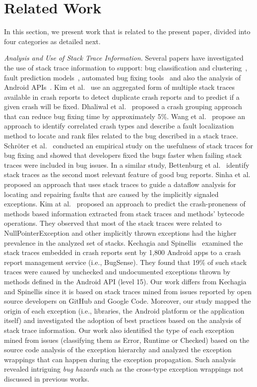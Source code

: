 \section{Related Work}
\label{sec:rele}

In this section, we present work that is related to the present paper, divided into
four categories as detailed next.

\textit{Analysis and Use of Stack Trace Information.} Several papers have
investigated the use of stack trace information to support: bug classification
and clustering~\cite{wang2013improving, kim2011crash, dhaliwal2011classifying},
fault prediction models~\cite{kim2013predicting}, automated
bug fixing tools~\cite{sinha2009fault} and also the analysis of Android APIs~\cite{kechagia2014}. 
Kim et al.~\cite{kim2011crash} use an
aggregated form of multiple stack traces available in crash reports to detect
duplicate crash reports and to predict if a given crash will be fixed. Dhaliwal
et al.~\cite{dhaliwal2011classifying} proposed a crash grouping approach that
can reduce bug fixing time by approximately 5\%. Wang et
al.~\cite{wang2013improving} propose an approach to identify correlated crash
types and describe a fault localization method to locate and rank files related
to the bug described in a stack trace. Schr\"oter et al.~\cite{schroter2010stack}
conducted an empirical study on the usefulness of stack traces for bug fixing
and showed that developers fixed the bugs faster when failing stack traces were
included in bug issues.  In a similar study, Bettenburg et
al.~\cite{bettenburg2008makes} identify stack traces as the second most relevant
 feature of good bug reports.  Sinha et al.~\cite{sinha2009fault} proposed an
approach that uses stack traces to guide a dataflow analysis for locating and
repairing faults that are caused by the implicitly signaled exceptions. Kim
at al.~\cite{kim2013predicting} proposed an approach to predict the
crash-proneness of methods based information extracted from stack traces and
methods' bytecode operations.  They observed that most of the stack traces were
related to NullPointerException and other implicitly thrown exceptions had
the higher prevalence in the analyzed set of stacks. Kechagia and Spinellis~\cite{kechagia2014}
examined the stack traces embedded in crash reports sent by 1,800 Android apps 
to a crash report management service (i.e., BugSense). They found that 19\% of such stack traces
were caused by unchecked and undocumented exceptions thrown by methods defined in the 
Android API (level 15). Our work differs from Kechagia and Spinellis since it is based on
stack traces mined from issues reported by open source developers on GitHub and Google Code.  
Moreover, our study mapped the origin of each exception 
(i.e., libraries, the Android platform or the application itself) and investigated
the adoption of best practices based on the analysis of stack trace information.
Our work also identified the type of each exception mined from issues
(classifying them as Error, Runtime or Checked) based on the source code
analysis of the exception hierarchy and analyzed the exception wrappings that can 
happen during the exception propagation.  Such analysis revealed intriguing 
\emph{bug hazards} such as the cross-type exception wrappings not discussed in previous works.


